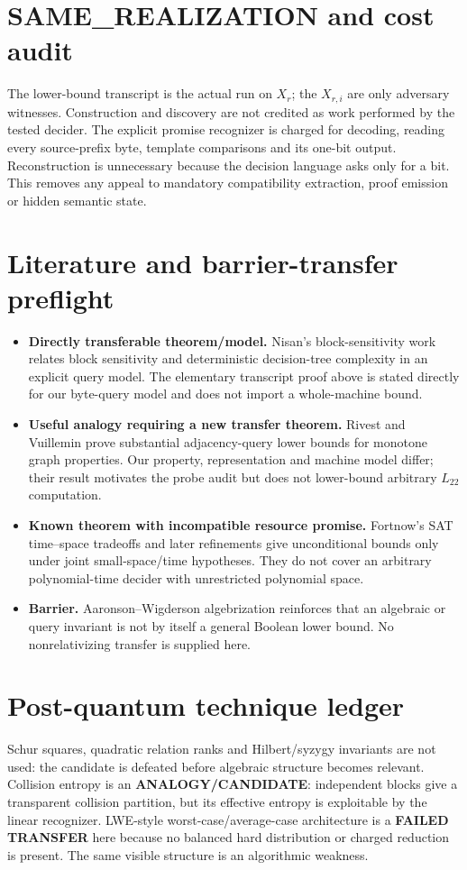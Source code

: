 \documentclass[11pt]{article}
\newcommand{\Ltwo}{L_{22}}
\begin{document}
\section{SAME\_REALIZATION and cost audit}
The lower-bound transcript is the actual run on $X_r$; the $X_{r,i}$ are only
adversary witnesses.  Construction and discovery are not credited as work
performed by the tested decider.  The explicit promise recognizer is charged
for decoding, reading every source-prefix byte, template comparisons and its
one-bit output.  Reconstruction is unnecessary because the decision language
asks only for a bit.  This removes any appeal to mandatory compatibility
extraction, proof emission or hidden semantic state.

\section{Literature and barrier-transfer preflight}
\begin{itemize}[leftmargin=*]
\item \textbf{Directly transferable theorem/model.}  Nisan's block-sensitivity
work relates block sensitivity and deterministic decision-tree complexity in
an explicit query model.  The elementary transcript proof above is stated
directly for our byte-query model and does not import a whole-machine bound.
\item \textbf{Useful analogy requiring a new transfer theorem.}  Rivest and
Vuillemin prove substantial adjacency-query lower bounds for monotone graph
properties.  Our property, representation and machine model differ; their
result motivates the probe audit but does not lower-bound arbitrary $\Ltwo$
computation.
\item \textbf{Known theorem with incompatible resource promise.}  Fortnow's
SAT time--space tradeoffs and later refinements give unconditional bounds only
under joint small-space/time hypotheses.  They do not cover an arbitrary
polynomial-time decider with unrestricted polynomial space.
\item \textbf{Barrier.}  Aaronson--Wigderson algebrization reinforces that an
algebraic or query invariant is not by itself a general Boolean lower bound.
No nonrelativizing transfer is supplied here.
\end{itemize}

\section{Post-quantum technique ledger}
Schur squares, quadratic relation ranks and Hilbert/syzygy invariants are not
used: the candidate is defeated before algebraic structure becomes relevant.
Collision entropy is an \textbf{ANALOGY/CANDIDATE}: independent blocks give a
transparent collision partition, but its effective entropy is exploitable by
the linear recognizer.  LWE-style worst-case/average-case architecture is a
\textbf{FAILED TRANSFER} here because no balanced hard distribution or charged
reduction is present.  The same visible structure is an algorithmic weakness.
\end{document}
